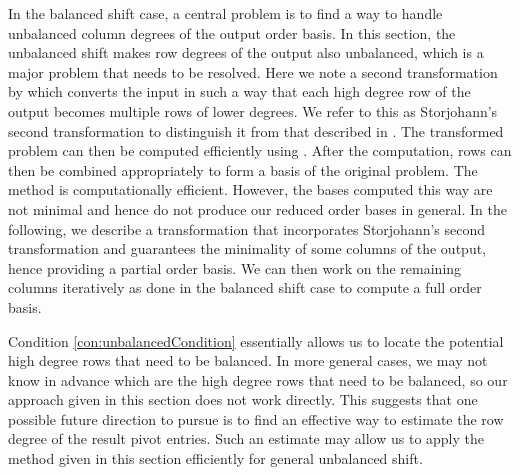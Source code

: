 In the balanced shift case, a central problem is to find a way to
handle unbalanced column degrees of the output order basis. In this
section, the unbalanced shift makes row degrees of the output also
unbalanced, which is a major problem that needs to be resolved. Here
we note a second transformation by \citet{Storjohann:2006} which
converts the input in such a way that each high degree row of the
output becomes multiple rows of lower degrees. We refer to this as
Storjohann's second transformation to distinguish it from that described
in . The transformed problem
can then be computed efficiently using . After
the computation, rows can then be combined appropriately to form a
basis of the original problem. The method is computationally efficient.
However, the bases computed this way are not minimal and hence do
not produce our reduced order bases in general. In the following,
we describe a transformation that incorporates Storjohann's second
transformation and guarantees the minimality of some columns of the
output, hence providing a partial order basis. We can then work on
the remaining columns iteratively as done in the balanced shift case
to compute a full order basis.

Condition \eqref{con:unbalancedCondition} essentially allows us to
locate the potential high degree rows that need to be balanced. In
more general cases, we may not know in advance which are the high
degree rows that need to be balanced, so our approach given in this
section does not work directly. This suggests that one possible future
direction to pursue is to find an effective way to estimate the row
degree of the result pivot entries. Such an estimate may allow us
to apply the method given in this section efficiently for general
unbalanced shift.

